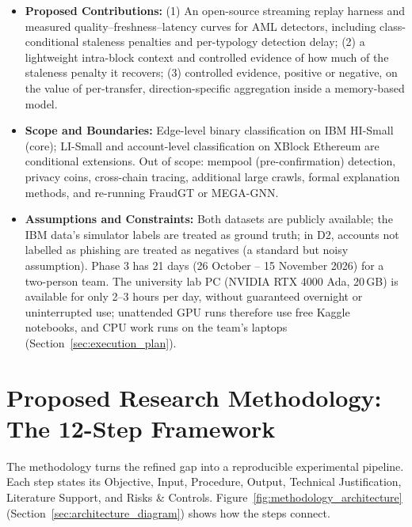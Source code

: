 \documentclass[11pt,a4paper]{article}
\begin{document}
\begin{itemize}[leftmargin=*]
    \item \textbf{Proposed Contributions:}
    (1) An open-source streaming replay harness and measured quality--freshness--latency curves for AML detectors, including class-conditional staleness penalties and per-typology detection delay; (2) a lightweight intra-block context and controlled evidence of how much of the staleness penalty it recovers; (3) controlled evidence, positive or negative, on the value of per-transfer, direction-specific aggregation inside a memory-based model.

    \item \textbf{Scope and Boundaries:}
    Edge-level binary classification on IBM HI-Small (core); LI-Small and account-level classification on XBlock Ethereum are conditional extensions. Out of scope: mempool (pre-confirmation) detection, privacy coins, cross-chain tracing, additional large crawls, formal explanation methods, and re-running FraudGT or MEGA-GNN.

    \item \textbf{Assumptions and Constraints:}
    Both datasets are publicly available; the IBM data's simulator labels are treated as ground truth; in D2, accounts not labelled as phishing are treated as negatives (a standard but noisy assumption). Phase 3 has 21 days (26 October -- 15 November 2026) for a two-person team. The university lab PC (NVIDIA RTX 4000 Ada, 20\,GB) is available for only 2--3 hours per day, without guaranteed overnight or uninterrupted use; unattended GPU runs therefore use free Kaggle notebooks, and CPU work runs on the team's laptops (Section~\ref{sec:execution_plan}).
\end{itemize}

\section{Proposed Research Methodology: The 12-Step Framework}
\label{sec:methodology}

The methodology turns the refined gap into a reproducible experimental pipeline. Each step states its Objective, Input, Procedure, Output, Technical Justification, Literature Support, and Risks \& Controls. Figure~\ref{fig:methodology_architecture} (Section~\ref{sec:architecture_diagram}) shows how the steps connect.

\end{document}
